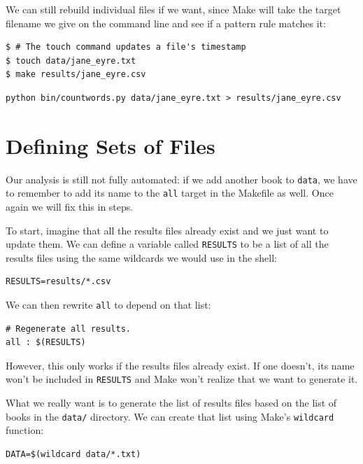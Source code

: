 \documentclass[
]{krantz}
\begin{document}
We can still rebuild individual files if we want,
since Make will take the target filename we give on the command line
and see if a pattern rule matches it:

\begin{verbatim}
$ # The touch command updates a file's timestamp
$ touch data/jane_eyre.txt
$ make results/jane_eyre.csv
\end{verbatim}

\begin{verbatim}
python bin/countwords.py data/jane_eyre.txt > results/jane_eyre.csv
\end{verbatim}

\hypertarget{automate-functions}{%
\section{Defining Sets of Files}\label{automate-functions}}

Our analysis is still not fully automated:
if we add another book to \texttt{data},
we have to remember to add its name to the \texttt{all} target in the Makefile as well.
Once again we will fix this in steps.

To start,
imagine that all the results files already exist
and we just want to update them.
We can define a variable called \texttt{RESULTS}
to be a list of all the results files
using the same wildcards we would use in the shell:

\begin{verbatim}
RESULTS=results/*.csv
\end{verbatim}

We can then rewrite \texttt{all} to depend on that list:

\begin{verbatim}
# Regenerate all results.
all : $(RESULTS)
\end{verbatim}

However,
this only works if the results files already exist.
If one doesn't,
its name won't be included in \texttt{RESULTS}
and Make won't realize that we want to generate it.

What we really want is to generate the list of results files
based on the list of books in the \texttt{data/} directory.
We can create that list using Make's \texttt{wildcard} function:

\begin{verbatim}
DATA=$(wildcard data/*.txt)
\end{verbatim}
\end{document}
